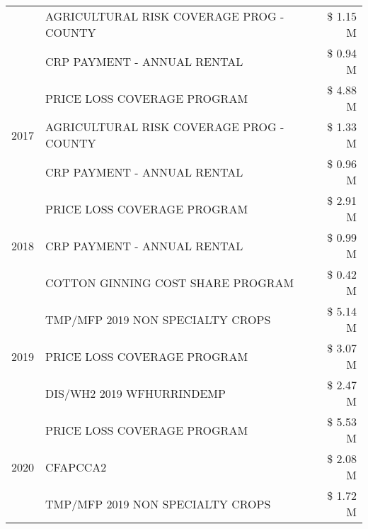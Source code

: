 \begin{tabular}{llr}
 & AGRICULTURAL RISK COVERAGE PROG - COUNTY      & \$ 1.15 M \\
 & CRP PAYMENT - ANNUAL RENTAL                   & \$ 0.94 M \\
\cline{1-3}
\multirow[t]{3}{*}{2017} & PRICE LOSS COVERAGE PROGRAM & \$ 4.88 M \\
 & AGRICULTURAL RISK COVERAGE PROG - COUNTY & \$ 1.33 M \\
 & CRP PAYMENT - ANNUAL RENTAL & \$ 0.96 M \\
\cline{1-3}
\multirow[t]{3}{*}{2018} & PRICE LOSS COVERAGE PROGRAM & \$ 2.91 M \\
 & CRP PAYMENT - ANNUAL RENTAL & \$ 0.99 M \\
 & COTTON GINNING COST SHARE PROGRAM & \$ 0.42 M \\
\cline{1-3}
\multirow[t]{3}{*}{2019} & TMP/MFP 2019 NON SPECIALTY CROPS & \$ 5.14 M \\
 & PRICE LOSS COVERAGE PROGRAM & \$ 3.07 M \\
 & DIS/WH2 2019 WFHURRINDEMP & \$ 2.47 M \\
\cline{1-3}
\multirow[t]{3}{*}{2020} & PRICE LOSS COVERAGE PROGRAM & \$ 5.53 M \\
 & CFAPCCA2 & \$ 2.08 M \\
 & TMP/MFP 2019 NON SPECIALTY CROPS & \$ 1.72 M \\
\cline{1-3}
\bottomrule
\end{tabular}
